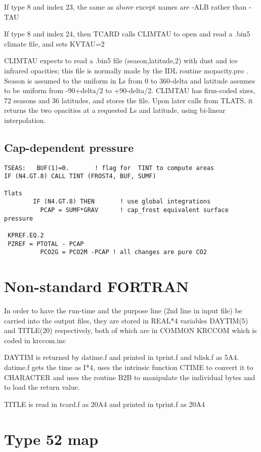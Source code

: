 \documentclass[draft]{article}  %
\begin{document}
If type 8 and index 23, the same as above except names are -ALB rather than -TAU

If type 8 and index 24, then TCARD calls CLIMTAU to open and read a .bin5 
climate file, and sets KVTAU=2

CLIMTAU expects to read a .bin5 file (season,latitude,2) with dust and ice
infrared opacities; this file is normally made by the IDL routine mopacity.pro .
Season is assumed to the uniform in Ls from 0 to 360-delta and latitude assumes
to be uniform from -90+delta/2 to +90-delta/2. CLIMTAU has firm-coded sizes, 72
seasons and 36 latitudes, and stores the file. Upon later calls from TLATS, it
returns the two opacities at a requested Ls and latitude, using bi-linear
interpolation.


\subsection{Cap-dependent pressure} %
\vspace{-3.mm} 
\begin{verbatim}
TSEAS:   BUF(1)=0.       ! flag for  TINT to compute areas
IF (N4.GT.8) CALL TINT (FROST4, BUF, SUMF)

Tlats
        IF (N4.GT.8) THEN       ! use global integrations
          PCAP = SUMF*GRAV      ! cap_frost equivalent surface pressure

 KPREF.EQ.2
 PZREF = PTOTAL - PCAP
          PCO2G = PCO2M -PCAP ! all changes are pure CO2

\end{verbatim}

\section{Non-standard FORTRAN}

In order to have the run-time and the purpose line (2nd line in input file) be carried into the output files, they are stored in REAL*4 variables DAYTIM(5) and TITLE(20) respectively, both of which are in  COMMON \/KRCCOM\/ which is coded in krccom.inc

DAYTIM is returned by datime.f and printed in tprint.f and tdisk.f as 5A4.
datime.f gets the time as I*4, uses the intrinsic function CTIME to convert it to CHARACTER and uses the routine B2B to manipulate the individual bytes and to load the return value.

TITLE is read in tcard.f as 20A4 and printed in tprint.f as 20A4

\appendix %

\section{Type 52 map \label{type52}}

\end{document}
